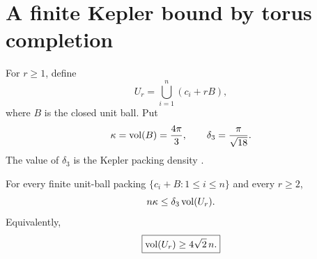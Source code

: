 \section{A finite Kepler bound by torus completion}
\label{sec:global}

For $r\ge1$, define
\begin{equation}\label{eq:Ur}
 U_r=\bigcup_{i=1}^n(c_i+rB),
\end{equation}
where $B$ is the closed unit ball.  Put
\[
 \kappa=\operatorname{vol}(B)=\frac{4\pi}{3},
 \qquad
 \delta_3=\frac{\pi}{\sqrt{18}}.
\]
The value of $\delta_3$ is the Kepler packing density
\cite{Hales2005}.

\begin{proposition}
\label{prop:finitekepler}
For every finite unit-ball packing $\{c_i+B:1\le i\le n\}$ and every $r\ge2$,
\begin{equation}\label{eq:finitekepler}
 n\kappa\le\delta_3\operatorname{vol}(U_r).
\end{equation}
Equivalently,
\begin{equation}\label{eq:volumelowergeneral}
 \boxed{\operatorname{vol}(U_r)\ge4\sqrt2\,n.}
\end{equation}
\end{proposition}

